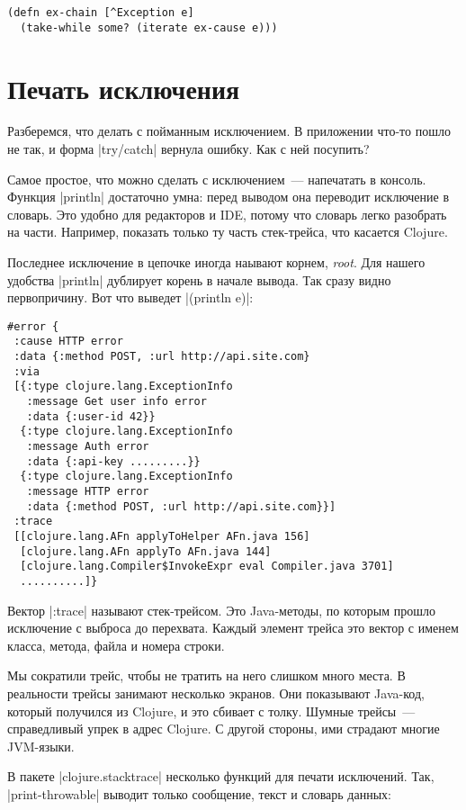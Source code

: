 \begin{verbatim}
(defn ex-chain [^Exception e]
  (take-while some? (iterate ex-cause e)))
\end{verbatim}

\section{Печать исключения}

Разберемся, что делать с пойманным исключением. В приложении что-то пошло не
так, и форма \spverb|try/catch| вернула ошибку. Как с ней посупить?

Самое простое, что можно сделать с исключением~--- напечатать в консоль. Функция
\spverb|println| достаточно умна: перед выводом она переводит исключение в
словарь. Это удобно для редакторов и IDE, потому что словарь легко разобрать на
части. Например, показать только ту часть стек-трейса, что касается Clojure.

Последнее исключение в цепочке иногда наывают корнем, \emph{root}. Для нашего
удобства \spverb|println| дублирует корень в начале вывода. Так сразу видно
первопричину. Вот что выведет \spverb|(println e)|:

\begin{verbatim}
#error {
 :cause HTTP error
 :data {:method POST, :url http://api.site.com}
 :via
 [{:type clojure.lang.ExceptionInfo
   :message Get user info error
   :data {:user-id 42}}
  {:type clojure.lang.ExceptionInfo
   :message Auth error
   :data {:api-key .........}}
  {:type clojure.lang.ExceptionInfo
   :message HTTP error
   :data {:method POST, :url http://api.site.com}}]
 :trace
 [[clojure.lang.AFn applyToHelper AFn.java 156]
  [clojure.lang.AFn applyTo AFn.java 144]
  [clojure.lang.Compiler$InvokeExpr eval Compiler.java 3701]
  ..........]}
\end{verbatim}

Вектор \spverb|:trace| называют стек-трейсом. Это Java-методы, по которым прошло
исключение с выброса до перехвата. Каждый элемент трейса это вектор с именем
класса, метода, файла и номера строки.

Мы сократили трейс, чтобы не тратить на него слишком много места. В реальности
трейсы занимают несколько экранов. Они показывают Java-код, который получился из
Clojure, и это сбивает с толку. Шумные трейсы~--- справедливый упрек в адрес
Clojure. С другой стороны, ими страдают многие JVM-языки.

В пакете \spverb|clojure.stacktrace| несколько функций для печати
исключений. Так, \spverb|print-throwable| выводит только сообщение, текст
и словарь данных:

